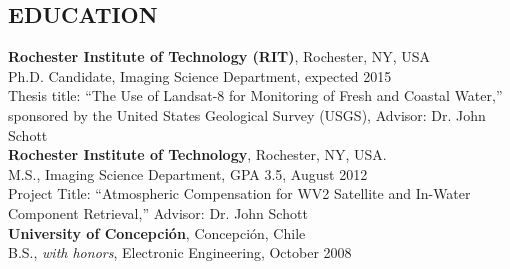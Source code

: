 \documentclass[11pt]{res} %
\begin{document}
\begin{resume}  
\vspace{-0.3in}                                         
\section{EDUCATION}
\vspace{0.1in}
{\bf Rochester Institute of Technology (RIT)}, Rochester, NY, USA\\
Ph.D. Candidate, Imaging Science Department, expected 2015\\
Thesis title: ``The Use of Landsat-8 for Monitoring of Fresh and Coastal Water,'' sponsored by the United States Geological Survey (USGS), Advisor: Dr. John Schott
\vspace{0.1in}\\
{\bf Rochester Institute of Technology}, Rochester, NY, USA.\\
M.S., Imaging Science Department, GPA 3.5, August 2012\\
Project Title: ``Atmospheric Compensation for WV2 Satellite and In-Water Component Retrieval,'' Advisor: Dr. John Schott
\vspace{0.1in}\\
{\bf University of Concepci\'on}, Concepci\'on, Chile \\
B.S., {\it with honors}, Electronic Engineering, October 2008\\

\vspace{-0.1in}

\end{resume}
\end{document}
